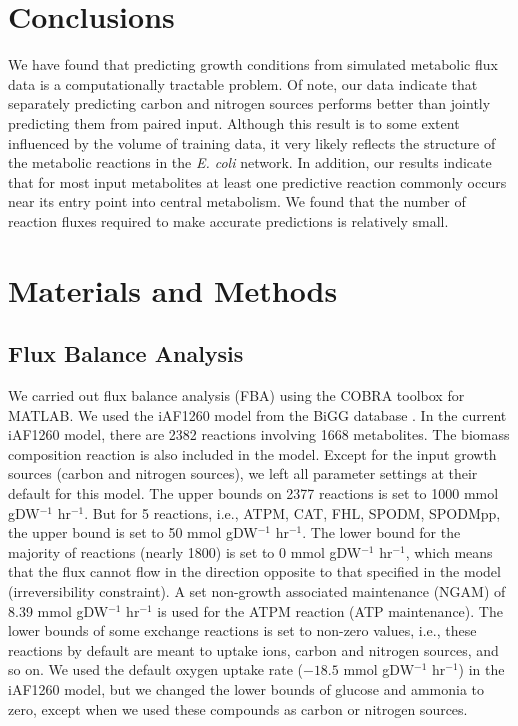 \documentclass[12pt]{article}
\begin{document}
\section{Conclusions}

We have found that predicting growth conditions from simulated metabolic flux data is a computationally tractable problem. Of note, our data indicate that separately predicting carbon and nitrogen sources performs better than jointly predicting them from paired input. Although this result is to some extent influenced by the volume of training data, it very likely reflects the structure of the metabolic reactions in the \emph{E. coli} network. In addition, our results indicate that for most input metabolites at least one predictive reaction commonly occurs near its entry point into central metabolism. We found that the number of reaction fluxes required to make accurate predictions is relatively small.


\section{Materials and Methods}

\subsection{Flux Balance Analysis} 

We carried out flux balance analysis (FBA) using the COBRA toolbox \cite{Schellenbergeretal2011} for MATLAB. 
We used the iAF1260 model from the BiGG database \cite{Schellenbergeretal2010}. In the current iAF1260 model, there are 2382 reactions involving 1668 metabolites. The biomass composition reaction is also included in the model. Except for the input growth sources (carbon and nitrogen sources), we left all parameter settings at their default for this model. The upper bounds on 2377 reactions is set to 1000  mmol gDW$^{-1}$ hr$^{-1}$. But for 5 reactions, i.e., ATPM, CAT, FHL, SPODM, SPODMpp, the upper bound is set to 50 mmol gDW$^{-1}$ hr$^{-1}$. The lower bound for the majority of reactions (nearly 1800) is set to 0 mmol gDW$^{-1}$ hr$^{-1}$, which means that the flux cannot flow in the direction opposite to that specified in the model (irreversibility constraint). A set non-growth associated maintenance (NGAM) of 8.39  mmol gDW$^{-1}$ hr$^{-1}$ is used for the ATPM reaction (ATP maintenance). The lower bounds of some exchange reactions is set to non-zero values, i.e., these reactions by default are meant to uptake ions, carbon and nitrogen sources, and so on. We used the default oxygen uptake rate ($-18.5$ mmol gDW$^{-1}$ hr$^{-1}$) in the iAF1260 model, but we changed the lower bounds of glucose and ammonia to zero, except when we used these compounds as carbon or nitrogen sources.
\end{document}
